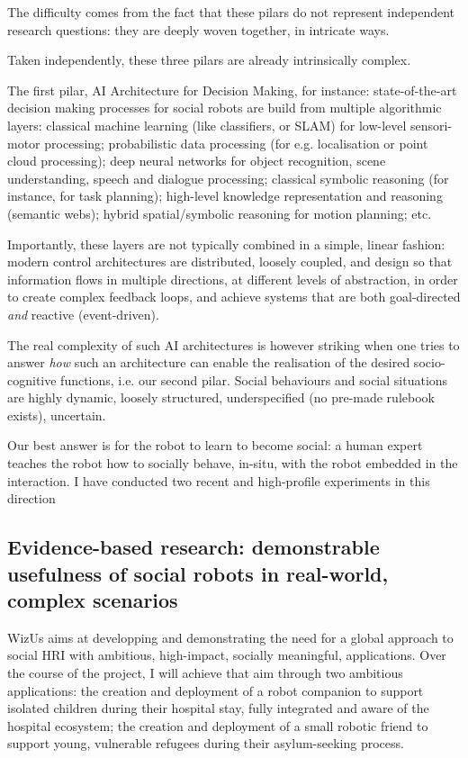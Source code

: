 \documentclass[11pt]{article}
\newcommand{\project}{WizUs\xspace}
\begin{document}
The difficulty comes from the fact that these pilars do not represent independent
research questions: they are deeply woven together, in intricate ways.


Taken independently, these three pilars are already intrinsically complex.

The first pilar, AI Architecture for Decision Making, for instance:
state-of-the-art decision making processes for social robots are build from
multiple algorithmic layers: classical machine learning (like classifiers, or
SLAM) for low-level sensori-motor processing; probabilistic data processing (for
e.g. localisation or point cloud processing); deep neural networks for object
recognition, scene understanding, speech and dialogue processing; classical
symbolic reasoning (for instance, for task planning); high-level knowledge
representation and reasoning (semantic webs); hybrid spatial/symbolic reasoning
for motion planning; etc.

Importantly, these layers are not typically combined in a simple, linear
fashion: modern control architectures are distributed, loosely coupled, and
design so that information flows in multiple directions, at different levels of
abstraction, in order to create complex feedback loops, and achieve systems that are
both goal-directed \emph{and} reactive (event-driven).


The real complexity of such AI architectures is however striking when one tries
to answer \emph{how} such an architecture can enable the realisation of the
desired socio-cognitive functions, i.e. our second pilar. Social behaviours and
social situations are highly dynamic, loosely structured, underspecified (no
pre-made rulebook exists), uncertain.

Our best answer is for the robot to learn to become social: a human expert teaches
the robot how to socially behave, in-situ, with the robot embedded in the
interaction. I have conducted two recent and high-profile experiments in this
direction

\subsection{Evidence-based research: demonstrable usefulness of social robots in
real-world, complex scenarios}

\project aims at developping and demonstrating the need for a global approach to
social HRI with ambitious, high-impact, socially meaningful, applications. Over
the course of the project, I will achieve that aim through two ambitious
applications: the creation and deployment of a robot companion to support
isolated children during their hospital stay, fully integrated and aware of the
hospital ecosystem; the creation and deployment of a small robotic friend to
support young, vulnerable refugees during their asylum-seeking process.
\end{document}
